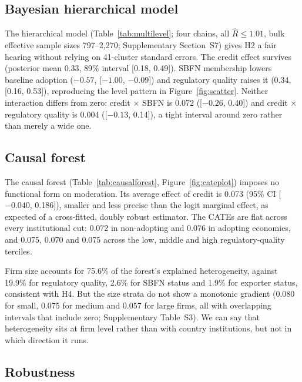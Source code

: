 \documentclass[review,authoryear,12pt]{elsarticle}
\begin{document}
\subsection{Bayesian hierarchical model}
\label{sec:multilevel}

The hierarchical model (Table~\ref{tab:multilevel}; four chains, all $\hat{R}\leq1.01$, bulk effective sample sizes 797--2{,}270; Supplementary Section~S7) gives H2 a fair hearing without relying on 41-cluster standard errors. The credit effect survives (posterior mean 0.33, 89\% interval [0.18, 0.49]). SBFN membership lowers baseline adoption ($-0.57$, [$-1.00$, $-0.09$]) and regulatory quality raises it (0.34, [0.16, 0.53]), reproducing the level pattern in Figure~\ref{fig:scatter}. Neither interaction differs from zero: credit $\times$ SBFN is 0.072 ([$-0.26$, 0.40]) and credit $\times$ regulatory quality is 0.004 ([$-0.13$, 0.14]), a tight interval around zero rather than merely a wide one.

\subsection{Causal forest}
\label{sec:causalforest}

The causal forest (Table~\ref{tab:causalforest}, Figure~\ref{fig:cateplot}) imposes no functional form on moderation. Its average effect of credit is 0.073 (95\% CI [$-0.040$, 0.186]), smaller and less precise than the logit marginal effect, as expected of a cross-fitted, doubly robust estimator. The CATEs are flat across every institutional cut: 0.072 in non-adopting and 0.076 in adopting economies, and 0.075, 0.070 and 0.075 across the low, middle and high regulatory-quality terciles.

Firm size accounts for 75.6\% of the forest's explained heterogeneity, against 19.9\% for regulatory quality, 2.6\% for SBFN status and 1.9\% for exporter status, consistent with H4. But the size strata do not show a monotonic gradient (0.080 for small, 0.075 for medium and 0.057 for large firms, all with overlapping intervals that include zero; Supplementary Table~S3). We can say that heterogeneity sits at firm level rather than with country institutions, but not in which direction it runs.

\subsection{Robustness}
\label{sec:robustness}
\label{sec:extension}
\end{document}
